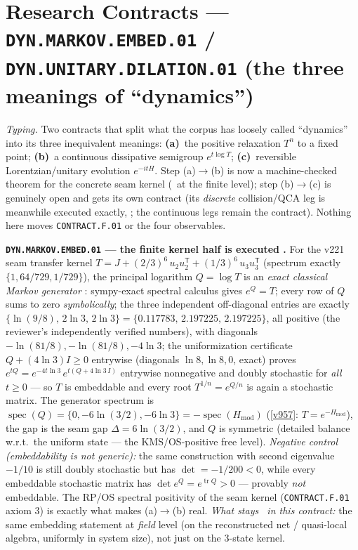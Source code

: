 \section*{Research Contracts --- \texttt{DYN.MARKOV.EMBED.01} / \texttt{DYN.UNITARY.DILATION.01} (the three meanings of ``dynamics'')}
\noindent\emph{Typing.} Two contracts that split what the corpus has loosely called ``dynamics''
into its three inequivalent meanings: \textbf{(a)}~the positive relaxation $T^n$ to a fixed
point; \textbf{(b)}~a continuous dissipative semigroup $e^{t\log T}$; \textbf{(c)}~reversible
Lorentzian/unitary evolution $e^{-itH}$.  Step (a)$\to$(b) is now a machine-checked theorem for
the concrete seam kernel (\mE\ at the finite level); step (b)$\to$(c) is genuinely open and gets
its own contract (its \emph{discrete} collision/QCA leg is meanwhile executed exactly,
; the continuous legs remain the contract).  Nothing here
moves \texttt{CONTRACT.F.01} or the four observables.

\par\smallskip\noindent\textbf{\texttt{DYN.MARKOV.EMBED.01} --- the finite kernel half is
executed \mE.}  For the v221 seam transfer
kernel $T=J+(2/3)^6\,u_2u_2^{\mathsf T}+(1/3)^6\,u_3u_3^{\mathsf T}$ (spectrum exactly
$\{1,64/729,1/729\}$), the principal logarithm $Q=\log T$ is an \emph{exact classical Markov
generator} : sympy-exact spectral calculus gives
$e^Q=T$; every row of $Q$ sums to zero
\emph{symbolically}; the three independent off-diagonal entries are exactly
$\{\ln(9/8),\,2\ln 3,\,2\ln 3\}=\{0.117783,\,2.197225,\,2.197225\}$, all positive (the reviewer's
independently verified numbers), with diagonals $-\ln(81/8),-\ln(81/8),-4\ln3$; the
uniformization certificate $Q+(4\ln3)I\ge0$ entrywise (diagonals $\ln8,\ln8,0$, exact) proves
$e^{tQ}=e^{-4t\ln3}\,e^{t(Q+4\ln3\,I)}$ entrywise nonnegative and doubly stochastic for
\emph{all} $t\ge0$ --- so $T$ is embeddable and every root $T^{1/n}=e^{Q/n}$ is again a
stochastic matrix.  The generator spectrum is
$\operatorname{spec}(Q)=\{0,-6\ln(3/2),-6\ln3\}=-\operatorname{spec}(H_{\mathrm{mod}})$
(\vref{v957}: $T=e^{-H_{\mathrm{mod}}}$), the gap is the seam gap $\Delta=6\ln(3/2)$, and $Q$ is
symmetric (detailed balance w.r.t.\ the uniform state --- the KMS/OS-positive free level).
\emph{Negative control (embeddability is not generic):} the same construction with second
eigenvalue $-1/10$ is still doubly stochastic but has $\det=-1/200<0$, while every embeddable
stochastic matrix has $\det e^Q=e^{\operatorname{tr}Q}>0$ --- provably \emph{not} embeddable.
The RP/OS spectral positivity of the seam kernel (\texttt{CONTRACT.F.01} axiom 3) is exactly
what makes (a)$\to$(b) real.  \emph{What stays \mO\ in this contract:} the same embedding
statement at \emph{field} level (on the reconstructed net / quasi-local algebra, uniformly in
system size), not just on the 3-state kernel.

